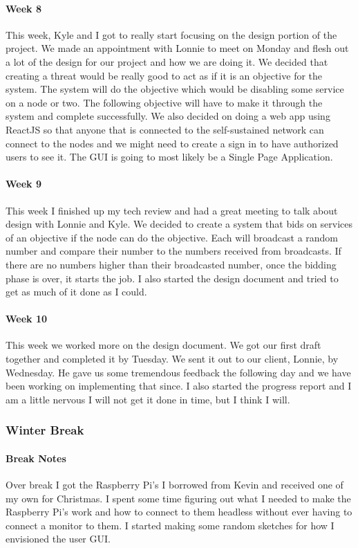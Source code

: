 \documentclass[draftclsnofoot, onecolumn, compsoc, 10pt]{IEEEtran}
\begin{document}
\paragraph{Week 8}
This week, Kyle and I got to really start focusing on the design portion of the project. We made an appointment with Lonnie to meet on Monday and flesh out a lot of the design for our project and how we are doing it. We decided that creating a threat would be really good to act as if it is an objective for the system. The system will do the objective which would be disabling some service on a node or two. The following objective will have to make it through the system and complete successfully. We also decided on doing a web app using ReactJS so that anyone that is connected to the self-sustained network can connect to the nodes and we might need to create a sign in to have authorized users to see it. The GUI is going to most likely be a Single Page Application.
\paragraph{Week 9}
This week I finished up my tech review and had a great meeting to talk about design with Lonnie and Kyle. We decided to create a system that bids on services of an objective if the node can do the objective. Each will broadcast a random number and compare their number to the numbers received from broadcasts. If there are no numbers higher than their broadcasted number, once the bidding phase is over, it starts the job. I also started the design document and tried to get as much of it done as I could. 
\paragraph{Week 10}
This week we worked more on the design document. We got our first draft together and completed it by Tuesday. We sent it out to our client, Lonnie, by Wednesday. He gave us some tremendous feedback the following day and we have been working on implementing that since. I also started the progress report and I am a little nervous I will not get it done in time, but I think I will. 
\subsubsection{Winter Break}
\paragraph{Break Notes}
Over break I got the Raspberry Pi's I borrowed from Kevin and received one of my own for Christmas. I spent some time figuring out what I needed to make the Raspberry Pi's work and how to connect to them headless without ever having to connect a monitor to them. I started making some random sketches for how I envisioned the user GUI.
\end{document}

